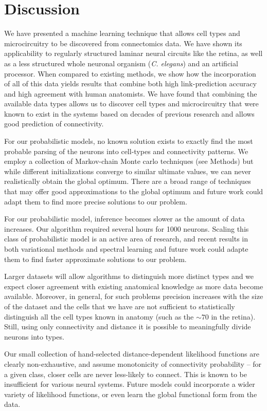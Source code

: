 \documentclass{article}
\begin{document}
\section*{Discussion}
We have presented a machine learning technique that allows cell types
and microcircuitry to be discovered from connectomics data.  We have
shown its applicability to regularly structured laminar neural circuits like the retina, 
as well as a less structured whole neuronal organism (\textit{C. elegans}) and an artificial processor. When compared to existing methods, we show how the
incorporation of all of this data yields results that combine both
high link-prediction accuracy and high agreement with human
anatomists. We have found that combining the
available data types allows us to discover cell types and
microcircuitry that were known to exist in the systems based on
decades of previous research and allows good prediction of
connectivity.

For our probabilistic models, no known solution exists to
exactly find the most probable parsing of the neurons into cell-types
and connectivity patterns. We employ a collection of Markov-chain
Monte carlo techniques (see Methods) but while different
initializations converge to similar ultimate values, we can never
realistically obtain the global optimum. There are a broad range of
techniques that may offer good approximations to the global optimum
and future work could adapt them to
find more precise solutions to our problem.

For our probabilistic model, inference becomes slower as the amount of
data increases. Our algorithm required several hours for 1000
neurons. Scaling this class of probabilistic model is an active area
of research, and recent results in both variational methods
\autocite{Hoffman2013} and spectral learning \autocite{Anandkumar2012}
and future work could adapte them to find faster approximate solutions
to our problem.

Larger datasets will allow algorithms to distinguish more distinct
types and we expect closer agreement with existing anatomical
knowledge as more data become available.  Moreover, in general, for
such problems precision increases with the size of the dataset and the
cells that we have are not sufficient to statistically distinguish all
the cell types known in anatomy (such as the $\sim 70$ in the
retina). Still, using only connectivity and distance it is possible to
meaningfully divide neurons into types.

Our small collection of hand-selected distance-dependent likelihood
functions are clearly non-exhaustive, and assume monotonicity
of connectivity probability -- for a given class, closer cells
are never less-likely to connect. This is known to be insufficient
for various neural systems. Future models could incorporate
a wider variety of likelihood functions, or even learn the global
functional form from the data. 
\end{document}
